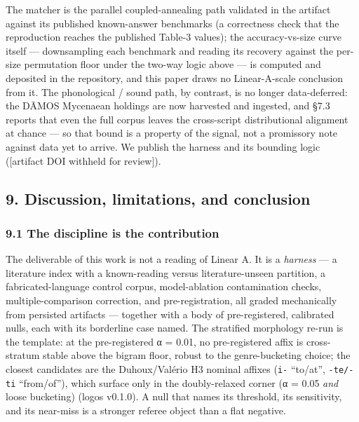 \documentclass[
  10pt,
]{article}
\begin{document}
The matcher is the parallel coupled-annealing path validated in the
artifact against its published known-answer benchmarks (a correctness
check that the reproduction reaches the published Table-3 values); the
accuracy-vs-size curve itself --- downsampling each benchmark and
reading its recovery against the per-size permutation floor under the
two-way logic above --- is computed and deposited in the repository, and
this paper draws no Linear-A-scale conclusion from it. The phonological
/ sound path, by contrast, is no longer data-deferred: the DĀMOS
Mycenaean holdings are now harvested and ingested, and §7.3 reports that
even the full corpus leaves the cross-script distributional alignment at
chance --- so that bound is a property of the signal, not a promissory
note against data yet to arrive. We publish the harness and its bounding
logic ({[}artifact DOI withheld for review{]}).

\hypertarget{discussion-limitations-and-conclusion}{%
\subsection{9. Discussion, limitations, and
conclusion}\label{discussion-limitations-and-conclusion}}

\hypertarget{the-discipline-is-the-contribution}{%
\subsubsection{9.1 The discipline is the
contribution}\label{the-discipline-is-the-contribution}}

The deliverable of this work is not a reading of Linear A. It is a
\emph{harness} --- a literature index with a known-reading versus
literature-unseen partition, a fabricated-language control corpus,
model-ablation contamination checks, multiple-comparison correction, and
pre-registration, all graded mechanically from persisted artifacts ---
together with a body of pre-registered, calibrated nulls, each with its
borderline case named. The stratified morphology re-run is the template:
at the pre-registered α = 0.01, no pre-registered affix is cross-stratum
stable above the bigram floor, robust to the genre-bucketing choice; the
closest candidates are the Duhoux/Valério H3 nominal affixes
(\texttt{i-} ``to/at'', \texttt{-te/-ti} ``from/of''), which surface
only in the doubly-relaxed corner (α = 0.05 \emph{and} loose bucketing)
(logos v0.1.0). A null that names its threshold, its sensitivity, and
its near-miss is a stronger referee object than a flat negative.
\end{document}

